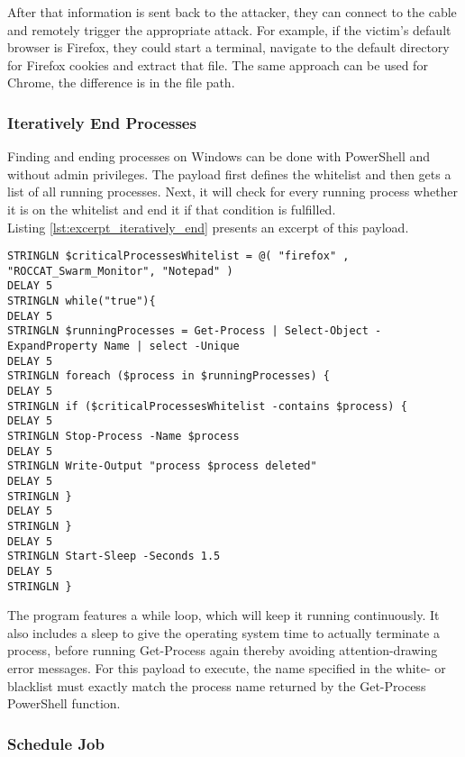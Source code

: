 After that information is sent back to the attacker, they can connect to the cable and remotely trigger the appropriate attack. For example, if the victim's default browser is Firefox, they could start a terminal, navigate to the default directory for Firefox cookies and extract that file. The same approach can be used for Chrome, the difference is in the file path.


\subsubsection{Iteratively End Processes}

Finding and ending processes on Windows can be done with PowerShell and without admin privileges. The payload first defines the whitelist and then gets a list of all running processes. Next, it will check for every running process whether it is on the whitelist and end it if that condition is fulfilled. \\
Listing \ref{lst:excerpt_iteratively_end} presents an excerpt of this payload.

\begin{lstlisting}[caption={Exceprt: a PowerShell looop that ends a running process if it is contained in the whitelist}, label={lst:excerpt_iteratively_end}, captionpos=b]
STRINGLN $criticalProcessesWhitelist = @( "firefox" , "ROCCAT_Swarm_Monitor", "Notepad" )
DELAY 5
STRINGLN while("true"){
DELAY 5
STRINGLN $runningProcesses = Get-Process | Select-Object -ExpandProperty Name | select -Unique
DELAY 5
STRINGLN foreach ($process in $runningProcesses) {
DELAY 5
STRINGLN if ($criticalProcessesWhitelist -contains $process) {
DELAY 5
STRINGLN Stop-Process -Name $process
DELAY 5
STRINGLN Write-Output "process $process deleted"
DELAY 5
STRINGLN }
DELAY 5
STRINGLN }
DELAY 5
STRINGLN Start-Sleep -Seconds 1.5
DELAY 5
STRINGLN }
\end{lstlisting}

The program features a while loop, which will keep it running continuously. It also includes a sleep to give the operating system time to actually terminate a process, before running Get-Process again thereby avoiding attention-drawing error messages. For this payload to execute, the name specified in the white- or blacklist must exactly match the process name returned by the Get-Process PowerShell function.



\subsubsection{Schedule Job}

